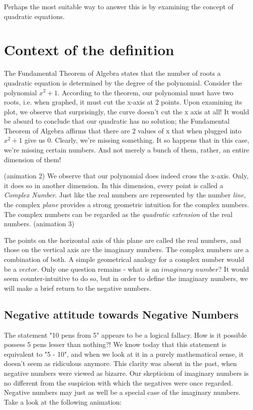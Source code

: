 \documentclass[final,3p]{CSP}
\begin{document}
Perhaps the most suitable way to answer this is by examining the concept of quadratic equations.

\section{Context of the definition}
\noindent
The Fundamental Theorem of Algebra states that the number of roots a quadratic equation is determined by the degree of the polynomial. Consider the polynomial $x^{2} + 1$. According to the theorem, our polynomial must have two roots, i.e. when graphed, it must cut the x-axis at 2 points. Upon examining its plot, we observe that surprisingly, the curve doesn't cut the x axis at all! It would be absurd to conclude that our quadratic has no solution;  the Fundamental Theorem of Algebra affirms that there are 2 values of x that when plugged into $x^{2} + 1$ give us 0. Clearly, we're missing something. It so happens that in this case, we're missing certain numbers. And not merely a bunch of them, rather, an entire dimension of them! \par
(animation 2)
We observe that our polynomial does indeed cross the x-axis. Only, it does so in another dimension. In this dimension, every point is called a \textit{Complex Number}. Just like the real numbers are represented by the number \textit{line}, the complex \textit{plane} provides a strong geometric intuition for the complex numbers. The complex numbers can be regarded as the \textit{quadratic extension} of the real numbers. 
(animation 3)\par

The points on the horizontal axis of this plane are called the real numbers, and those on the vertical axis are the imaginary numbers. The complex numbers are a combination of both. A simple geometrical analogy for a complex number would be a $\textit{vector}$. Only one question remains - what is an $\textit{imaginary number}?$ It would seem counter-intuitive to do so, but in order to define the imaginary numbers, we will make a brief return to the negative numbers.

\subsection{Negative attitude towards Negative Numbers}
The statement "10 pens from 5" appears to be a logical fallacy. How is it possible possess 5 pens lesser than nothing?! We know today that this statement is equivalent to "5 - 10", and when we look at it in a purely mathematical sense, it doesn't seem as ridiculous anymore. This clarity was absent in the past, when negative numbers were viewed as bizarre. Our skepticism of imaginary numbers is no different from the suspicion with which the negatives were once regarded. Negative numbers may just as well be a special case of the imaginary numbers. Take a look at the following animation:
\end{document}

